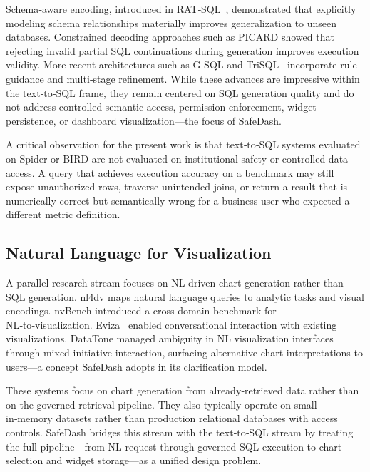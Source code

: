 \documentclass[11pt]{article}
\begin{document}
Schema‑aware encoding, introduced in RAT‑SQL~\cite{wang2020ratsql}, demonstrated that explicitly modeling schema relationships materially improves generalization to unseen databases. Constrained decoding approaches such as PICARD\cite{scholak2021picard} showed that rejecting invalid partial SQL continuations during generation improves execution validity. More recent architectures such as G‑SQL\cite{shalaan2025gsql} and TriSQL~\cite{su2026trisql} incorporate rule guidance and multi‑stage refinement. While these advances are impressive within the text‑to‑SQL frame, they remain centered on SQL generation quality and do not address controlled semantic access, permission enforcement, widget persistence, or dashboard visualization—the focus of SafeDash.

A critical observation for the present work is that text‑to‑SQL systems evaluated on Spider or BIRD are not evaluated on institutional safety or controlled data access. A query that achieves execution accuracy on a benchmark may still expose unauthorized rows, traverse unintended joins, or return a result that is numerically correct but semantically wrong for a business user who expected a different metric definition.

\subsection{Natural Language for Visualization}
A parallel research stream focuses on NL‑driven chart generation rather than SQL generation. nl4dv\cite{narechania2021nl4dv} maps natural language queries to analytic tasks and visual encodings. nvBench\cite{luo2021nvbench} introduced a cross‑domain benchmark for NL‑to‑visualization. Eviza~\cite{setlur2016eviza} enabled conversational interaction with existing visualizations. DataTone\cite{gao2015datatone} managed ambiguity in NL visualization interfaces through mixed‑initiative interaction, surfacing alternative chart interpretations to users—a concept SafeDash adopts in its clarification model.

These systems focus on chart generation from already‑retrieved data rather than on the governed retrieval pipeline. They also typically operate on small in‑memory datasets rather than production relational databases with access controls. SafeDash bridges this stream with the text‑to‑SQL stream by treating the full pipeline—from NL request through governed SQL execution to chart selection and widget storage—as a unified design problem.
\end{document}
